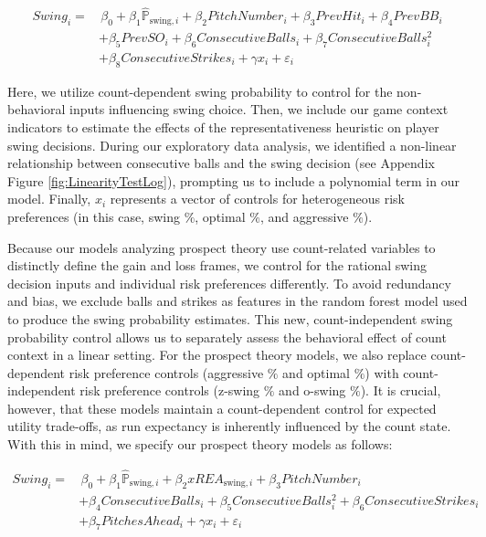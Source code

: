 \documentclass[12pt]{article}
\numberwithin{equation}{section}
\begin{document}
\begin{align}
Swing_i = & \, \beta_0 + \beta_1 \hat{\mathbb{P}}_{\text{swing}, i} + \beta_2 PitchNumber_i + \beta_3 PrevHit_i + \beta_4 PrevBB_i \nonumber \\
          & + \beta_5 PrevSO_i + \beta_6 ConsecutiveBalls_i + \beta_7 ConsecutiveBalls_i^2 \nonumber \\
          & + \beta_8 ConsecutiveStrikes_i + \gamma x_i + \varepsilon_i
\label{eq:reg_rep}
\end{align}

\vspace{5mm} %

Here, we utilize count-dependent swing probability to control for the non-behavioral inputs influencing swing choice. Then, we include our game context indicators to estimate the effects of the representativeness heuristic on player swing decisions. During our exploratory data analysis, we identified a non-linear relationship between consecutive balls and the swing decision (see Appendix Figure \ref{fig:LinearityTestLog}), prompting us to include a polynomial term in our model.  Finally, $x_i$ represents a vector of controls for heterogeneous risk preferences (in this case, swing $\%$, optimal $\%$, and aggressive $\%$).

\vspace{5mm} %

Because our models analyzing prospect theory use count-related variables to distinctly define the gain and loss frames, we control for the rational swing decision inputs and individual risk preferences differently. To avoid redundancy and bias, we exclude balls and strikes as features in the random forest model used to produce the swing probability estimates. This new, count-independent swing probability control allows us to separately assess the behavioral effect of count context in a linear setting. For the prospect theory models, we also replace count-dependent risk preference controls (aggressive $\%$ and optimal $\%$) with count-independent risk preference controls (z-swing $\%$ and o-swing $\%$). It is crucial, however, that these models maintain a count-dependent control for expected utility trade-offs, as run expectancy is inherently influenced by the count state. With this in mind, we specify our prospect theory models as follows:

\begin{align}
Swing_i = & \, \beta_0 + \beta_1 \hat{\mathbb{P}}_{\text{swing}, i} + \beta_2 {xREA}_{\text{swing}, i} + \beta_3 PitchNumber_i \nonumber \\
          & + \beta_4 ConsecutiveBalls_i + \beta_5 ConsecutiveBalls_i^2 + \beta_6 ConsecutiveStrikes_i \nonumber \\
          & + \beta_7 PitchesAhead_i + \gamma x_i + \varepsilon_i
\label{eq:reg_pt1}
\end{align}
\end{document}
